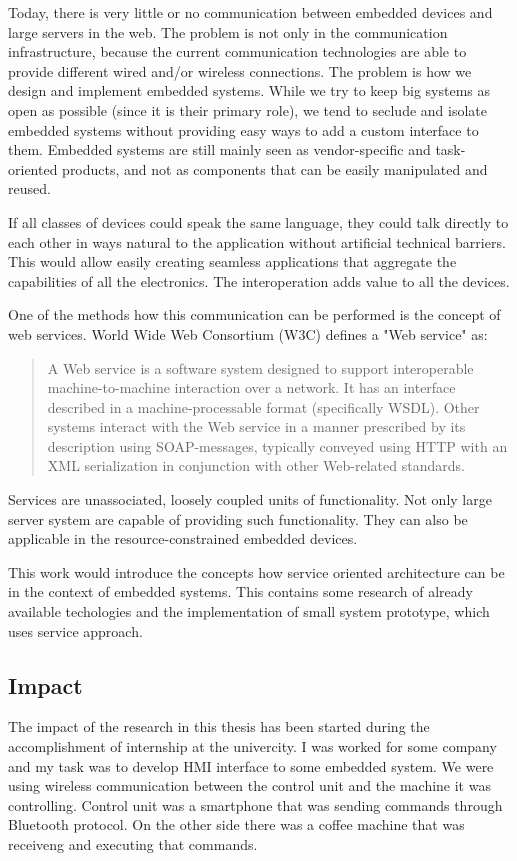 Today, there is very little or no communication between embedded devices and large servers in the web.
The problem is not only in the communication infrastructure, because the current communication technologies are able to provide different wired and/or wireless connections.
The problem is how we design and implement embedded systems. While we
try to keep big systems as open as possible (since it is their primary role), we tend to seclude and isolate embedded systems without providing easy ways to add a
custom interface to them. Embedded systems are still mainly seen as vendor-specific and task-oriented products, and not as components that can be easily manipulated and reused.

If all classes of devices could speak the same language, they could 
talk directly to each other in ways natural to the application without artificial technical barriers. This would allow easily 
creating seamless applications that aggregate the capabilities of all 
the electronics. The interoperation adds value to all the devices.


One of the methods how this communication can be performed is the concept of web services.
World Wide Web Consortium (W3C) defines a "Web service" as: 
\begin{quote}
A Web service is a software system designed to support interoperable machine-to-machine interaction over a network.
It has an interface described in a machine-processable format (specifically WSDL).
Other systems interact with the Web service in a manner prescribed by its description using SOAP-messages, typically conveyed using HTTP with an XML serialization in conjunction with other Web-related standards. 
\end{quote}

Services are unassociated, loosely coupled units of functionality.
Not only large server system are capable of providing such functionality.
They can also be applicable in the resource-constrained embedded devices.

This work would introduce the concepts how service oriented architecture can be in the  context  of  embedded  systems.
This contains some research of already available techologies and the implementation of small system prototype, which uses service approach.

\subsection{Impact}
The impact of the research in this thesis has been started during the accomplishment of internship at the univercity. 
I was worked for some company and my task was to develop \gls{HMI} interface to some embedded system.
We were using wireless communication between the control unit and the machine it was controlling.
Control unit was a smartphone that was sending commands through Bluetooth protocol.
On the other side there was a coffee machine that was receiveng and executing that commands.


